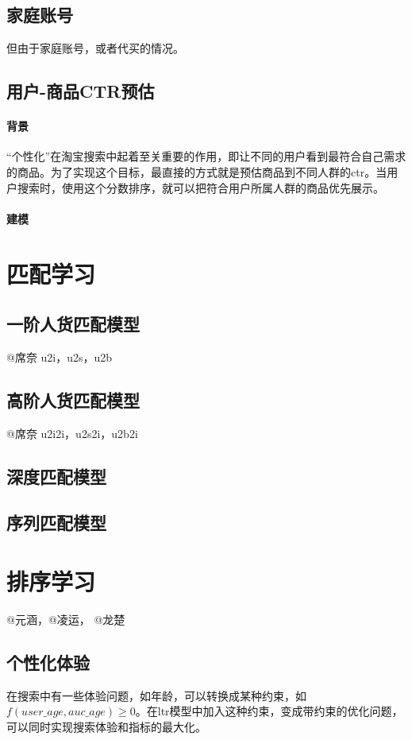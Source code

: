 	\subsection{家庭账号}
	但由于家庭账号，或者代买的情况。
	\subsection{用户-商品CTR预估}
	\paragraph{背景}
	“个性化”在淘宝搜索中起着至关重要的作用，即让不同的用户看到最符合自己需求的商品。为了实现这个目标，最直接的方式就是预估商品到不同人群的ctr。当用户搜索时，使用这个分数排序，就可以把符合用户所属人群的商品优先展示。
	\paragraph{建模}
	

\section{匹配学习}
	
	
\subsection{一阶人货匹配模型} 
	@席奈 u2i，u2s，u2b 

\subsection{高阶人货匹配模型} 
	@席奈 u2i2i，u2s2i，u2b2i 

\subsection{深度匹配模型} 

\subsection{序列匹配模型} 
	
\section{排序学习}
	@元涵，@凌运， @龙楚
	\subsection{个性化体验}
	在搜索中有一些体验问题，如年龄，可以转换成某种约束，如$f(user\_age,auc\_age)\geq0$。在ltr模型中加入这种约束，变成带约束的优化问题，可以同时实现搜索体验和指标的最大化。
	

